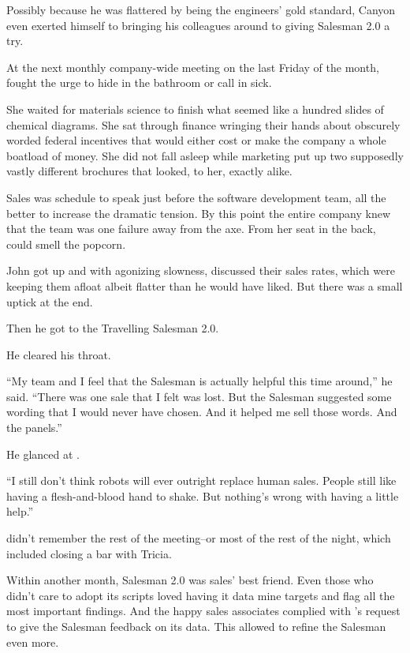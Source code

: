 Possibly because he was flattered by being the engineers' gold standard, Canyon even exerted himself to bringing his colleagues around to giving Salesman 2.0 a try.

At the next monthly company-wide meeting on the last Friday of the month, {\protag} fought the urge to hide in the bathroom or call in sick.

She waited for materials science to finish what seemed like a hundred slides of chemical diagrams. She sat through finance wringing their hands about obscurely worded federal incentives that would either cost or make the company a whole boatload of money. She did not fall asleep while marketing put up two supposedly vastly different brochures that looked, to her, exactly alike.

Sales was schedule to speak just before the software development team, all the better to increase the dramatic tension. By this point the entire company knew that the team was one failure away from the axe. From her seat in the back, {\protag} could smell the popcorn.

John got up and with agonizing slowness, discussed their sales rates, which were keeping them afloat albeit flatter than he would have liked. But there was a small uptick at the end.

Then he got to the Travelling Salesman 2.0.

He cleared his throat.

``My team and I feel that the Salesman is actually helpful this time around,'' he said. ``There was one sale that I felt was lost. But the Salesman suggested some wording that I would never have chosen. And it helped me sell those words. And the panels.''

He glanced at {\protag}.

``I still don't think robots will ever outright replace human sales. People still like having a flesh-and-blood hand to shake. But nothing's wrong with having a little help.''

{\protag} didn't remember the rest of the meeting--or most of the rest of the night, which included closing a bar with Tricia.

\bigbreak

Within another month, Salesman 2.0 was sales' best friend. Even those who didn't care to adopt its scripts loved having it data mine targets and flag all the most important findings. And the happy sales associates complied with {\protag}'s request to give the Salesman feedback on its data. This allowed {\protag} to refine the Salesman even more.

